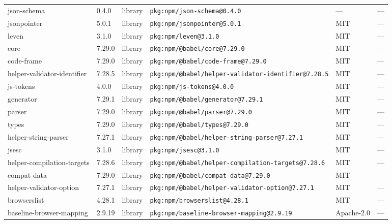 \documentclass[11pt,a4paper]{article}
\begin{document}
\begin{longtable}{|p{4cm}|p{2cm}|p{1.6cm}|p{5cm}|p{1.5cm}|p{3.5cm}|}
\raggedright json-schema & 0.4.0 & library & \small\texttt{pkg:npm/json-schema@0.4.0} & — & \small — \\
\raggedright jsonpointer & 5.0.1 & library & \small\texttt{pkg:npm/jsonpointer@5.0.1} & MIT & \small — \\
\raggedright leven & 3.1.0 & library & \small\texttt{pkg:npm/leven@3.1.0} & MIT & \small — \\
\raggedright core & 7.29.0 & library & \small\texttt{pkg:npm/@babel/core@7.29.0} & MIT & \small — \\
\raggedright code-frame & 7.29.0 & library & \small\texttt{pkg:npm/@babel/code-frame@7.29.0} & MIT & \small — \\
\raggedright helper-validator-identifier & 7.28.5 & library & \small\texttt{pkg:npm/@babel/helper-validator-identifier@7.28.5} & MIT & \small — \\
\raggedright js-tokens & 4.0.0 & library & \small\texttt{pkg:npm/js-tokens@4.0.0} & MIT & \small — \\
\raggedright generator & 7.29.1 & library & \small\texttt{pkg:npm/@babel/generator@7.29.1} & MIT & \small — \\
\raggedright parser & 7.29.0 & library & \small\texttt{pkg:npm/@babel/parser@7.29.0} & MIT & \small — \\
\raggedright types & 7.29.0 & library & \small\texttt{pkg:npm/@babel/types@7.29.0} & MIT & \small — \\
\raggedright helper-string-parser & 7.27.1 & library & \small\texttt{pkg:npm/@babel/helper-string-parser@7.27.1} & MIT & \small — \\
\raggedright jsesc & 3.1.0 & library & \small\texttt{pkg:npm/jsesc@3.1.0} & MIT & \small — \\
\raggedright helper-compilation-targets & 7.28.6 & library & \small\texttt{pkg:npm/@babel/helper-compilation-targets@7.28.6} & MIT & \small — \\
\raggedright compat-data & 7.29.0 & library & \small\texttt{pkg:npm/@babel/compat-data@7.29.0} & MIT & \small — \\
\raggedright helper-validator-option & 7.27.1 & library & \small\texttt{pkg:npm/@babel/helper-validator-option@7.27.1} & MIT & \small — \\
\raggedright browserslist & 4.28.1 & library & \small\texttt{pkg:npm/browserslist@4.28.1} & MIT & \small — \\
\raggedright baseline-browser-mapping & 2.9.19 & library & \small\texttt{pkg:npm/baseline-browser-mapping@2.9.19} & Apache-2.0 & \small — \\

\end{longtable}
\end{document}

